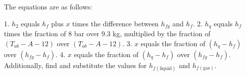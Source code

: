 The equations are as follows:

1. \( h_2 \) equals \( h_f \) plus \( x \) times the difference between \( h_{fg} \) and \( h_f \).
2. \( h_q \) equals \( h_f \) times the fraction of 8 bar over 9.3 kg, multiplied by the fraction of \( (T_{ab} - A - 12) \) over \( (T_{ab} - A - 12) \).
3. \( x \) equals the fraction of \( (h_q - h_f) \) over \( (h_{fg} - h_f) \).
4. \( x \) equals the fraction of \( (h_q - h_f) \) over \( (h_{fg} - h_f) \). Additionally, find and substitute the values for \( h_{f(\text{liquid})} \) and \( h_{f(\text{gas})} \).